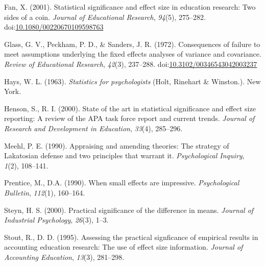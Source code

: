 \documentclass[man]{apa6}
\begin{document}
\hypertarget{refs}{}
\leavevmode\hypertarget{ref-Fan_2001}{}%
Fan, X. (2001). Statistical significance and effect size in education research: Two sides of a coin. \emph{Journal of Educational Research}, \emph{94}(5), 275--282. doi:\href{https://doi.org/10.1080/00220670109598763}{10.1080/00220670109598763}

\leavevmode\hypertarget{ref-Glass_et_al_1972}{}%
Glass, G. V., Peckham, P. D., \& Sanders, J. R. (1972). Consequences of failure to meet assumptions underlying the fixed effects analyses of variance and covariance. \emph{Review of Educational Research}, \emph{42}(3), 237--288. doi:\href{https://doi.org/10.3102/00346543042003237}{10.3102/00346543042003237}

\leavevmode\hypertarget{ref-Hays_1963}{}%
Hays, W. L. (1963). \emph{Statistics for psychologists} (Holt, Rinehart \& Winston.). New York.

\leavevmode\hypertarget{ref-Henson_Smith_2000}{}%
Henson, S., R. I. (2000). State of the art in statistical significance and effect size reporting: A review of the APA task force report and current trends. \emph{Journal of Research and Development in Education}, \emph{33}(4), 285--296.

\leavevmode\hypertarget{ref-Meehl_1990}{}%
Meehl, P. E. (1990). Appraising and amending theories: The strategy of Lakatosian defense and two principles that warrant it. \emph{Psychological Inquiry}, \emph{1}(2), 108--141.

\leavevmode\hypertarget{ref-Prentice_Miller_1992}{}%
Prentice, M., D.A. (1990). When small effects are impressive. \emph{Psychological Bulletin}, \emph{112}(1), 160--164.

\leavevmode\hypertarget{ref-Steyn_2000}{}%
Steyn, H. S. (2000). Practical significance of the difference in means. \emph{Journal of Industrial Psychology}, \emph{26}(3), 1--3.

\leavevmode\hypertarget{ref-Stout_Ruble_1995}{}%
Stout, R., D. D. (1995). Assessing the practical signficance of empirical results in accounting education research: The use of effect size information. \emph{Journal of Accounting Education}, \emph{13}(3), 281--298.
\end{document}
